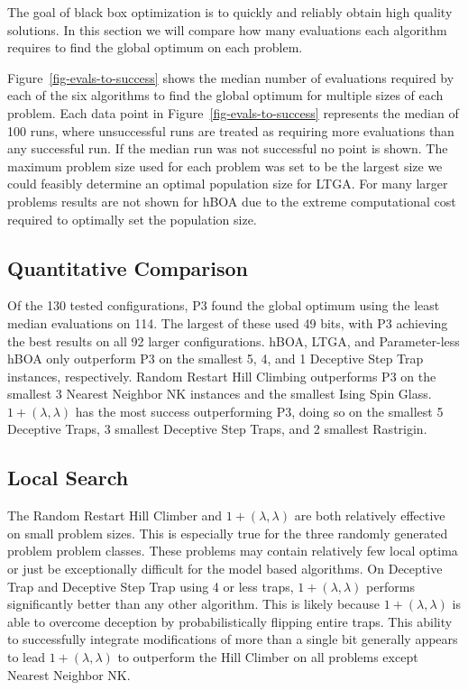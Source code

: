 \documentclass[twoside]{article}
\begin{document}
The goal of black box optimization is to quickly and reliably obtain high quality solutions. In this
section we will compare how many evaluations each algorithm requires to find the global optimum on
each problem.

Figure~\ref{fig-evals-to-success} shows the median number of evaluations required by each of the six
algorithms to find the global optimum for multiple sizes of each problem.  Each data point in
Figure~\ref{fig-evals-to-success} represents the median of 100 runs, where unsuccessful runs
are treated as requiring more evaluations than any successful run. If the median run was not successful
no point is shown. The maximum problem size used for each problem was set to be the largest size we could
feasibly determine an optimal population size for LTGA. For many larger problems results are not shown
for hBOA due to the extreme computational cost required to optimally set the population size.

\subsection{Quantitative Comparison}
Of the 130 tested configurations, P3 found the global optimum using the least median evaluations on 114.
The largest of these used 49 bits, with P3 achieving the best results on all 92 larger
configurations. hBOA, LTGA, and Parameter-less hBOA only outperform P3 on the smallest 5, 4, and 1 Deceptive
Step Trap instances, respectively. Random Restart Hill Climbing outperforms P3 on the smallest 3 Nearest Neighbor NK instances
and the smallest Ising Spin Glass. $1+(\lambda, \lambda)$ has the most success outperforming P3, doing so
on the smallest 5 Deceptive Traps, 3 smallest Deceptive Step Traps, and 2 smallest Rastrigin.

\subsection{Local Search}
The Random Restart Hill Climber and $1+(\lambda, \lambda)$ are both relatively effective on small problem
sizes. This is especially true for the three randomly generated problem problem classes. These problems
may contain relatively few local optima or just be exceptionally difficult for the model based algorithms.
On Deceptive Trap and Deceptive Step Trap using 4 or less traps, $1+(\lambda, \lambda)$ performs significantly
better than any other algorithm. This is likely
because $1+(\lambda, \lambda)$ is able to overcome deception by probabilistically
flipping entire traps.
This ability to successfully integrate modifications of more than a single bit generally appears to lead $1+(\lambda, \lambda)$
to outperform the Hill Climber on all problems except Nearest Neighbor NK.
\end{document}
